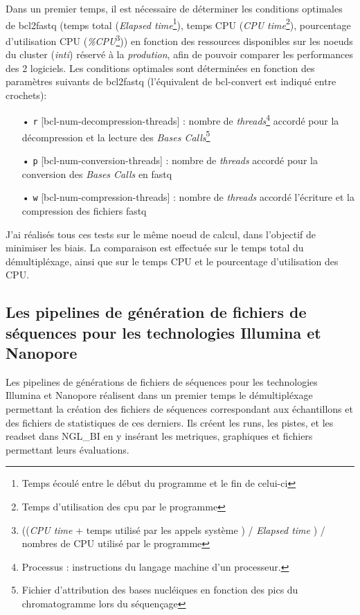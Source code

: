Dans un premier temps, il est nécessaire de déterminer les conditions optimales de bcl2fastq (temps total (\emph{Elapsed time}\footnote{Temps écoulé entre le début du programme et le fin de celui-ci}), temps CPU (\emph{CPU time}\footnote{Temps d'utilisation des cpu par le programme}), pourcentage d'utilisation CPU (\emph{\%CPU}\footnote{((\emph{CPU time} + temps utilisé par les appels système ) / \emph{Elapsed time} ) / nombres de CPU utilisé par le programme})) en fonction des ressources disponibles sur les noeuds du cluster (\emph{inti}) réservé à la \emph{prodution}, afin de pouvoir comparer les performances des 2 logiciels. Les conditions optimales sont déterminées en fonction des paramètres suivants de bcl2fastq (l'équivalent de bcl-convert est indiqué entre crochets): \\
\begin{itemize}
    \item[•] \texttt{r} [bcl-num-decompression-threads] : nombre de \emph{threads}\footnote{Processus : instructions du langage machine d'un processeur.} accordé pour la décompression et la lecture des \emph{Bases Calls}\footnote{Fichier d'attribution des bases nucléiques en fonction des pics du chromatogramme lors du séquençage}
    \item[•] \texttt{p} [bcl-num-conversion-threads] : nombre de \emph{threads} accordé pour la conversion des \emph{Bases Calls} en fastq
    \item[•] \texttt{w} [bcl-num-compression-threads] : nombre de \emph{threads} accordé l'écriture et la compression des fichiers fastq\\
\end{itemize}

J'ai réalisés tous ces tests sur le même noeud de calcul, dans l'objectif de minimiser les biais. La comparaison est effectuée sur le temps total du démultipléxage, ainsi que sur le temps CPU et le pourcentage d'utilisation des CPU.

\subsection{Les pipelines de génération de fichiers de séquences pour les technologies Illumina et Nanopore}
Les pipelines de générations de fichiers de séquences pour les technologies Illumina et Nanopore réalisent dans un premier temps le démultipléxage permettant la création des fichiers de séquences correspondant aux échantillons et des fichiers de statistiques de ces derniers. Ils créent les runs, les pistes, et les readset dans NGL\_BI en y insérant les metriques, graphiques et fichiers permettant leurs évaluations.\\

